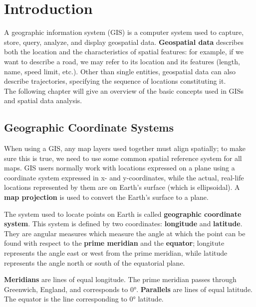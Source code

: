 \chapter{Introduction}

A geographic information system (GIS) is a computer system used to capture, store, query, analyze, and display geospatial data. \textbf{Geospatial data} describes both the location and the characteristics of spatial features: for example, if we want to describe a road, we may refer to its location and its features (length, name, speed limit, etc.). Other than single entities, geospatial data can also describe trajectories, specifying the sequence of locations constituting it.\\
The following chapter will give an overview of the basic concepts used in GISs and spatial data analysis.

\section{Geographic Coordinate Systems}

When using a GIS, any map layers used together must align spatially; to make sure this is true, we need to use some common spatial reference system for all maps. GIS users normally work with locations expressed on a plane using a coordinate system expressed in x- and y-coordinates, while the actual, real-life locations represented by them are on Earth's surface (which is ellipsoidal). A \textbf{map projection} is used to convert the Earth's surface to a plane.

The system used to locate points on Earth is called \textbf{geographic coordinate system}. This system is defined by two coordinates: \textbf{longitude} and \textbf{latitude}. They are angular measures which measure the angle at which the point can be found with respect to the \textbf{prime meridian} and the \textbf{equator}; longitute represents the angle east or west from the prime meridian, while latitude represents the angle north or south of the equatorial plane.

\textbf{Meridians} are lines of equal longitude. The prime meridian passes through Greenwich, England, and corresponds to 0°. \textbf{Parallels} are lines of equal latitude. The equator is the line corresponding to 0° latitude.

